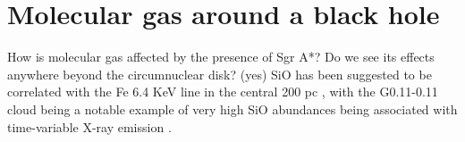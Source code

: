 \section{Molecular gas around a black hole}
How is molecular gas affected by the presence of Sgr A*?  Do we see its effects anywhere beyond the circumnuclear disk?  (yes) SiO has been suggested to be correlated with the Fe 6.4 KeV line in the central 200 pc \citep{JMP00}, with the G0.11-0.11 cloud \citep{Handa} being a notable example of very high SiO abundances being associated with time-variable X-ray emission \citep{Ponti10}.

